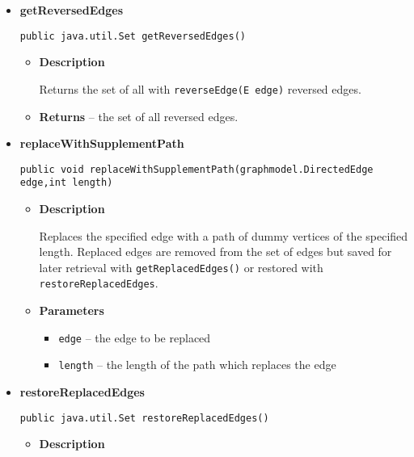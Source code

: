 {{{{{{{{{\begin{itemize}
{\begin{itemize}
{Returns the set of replaced edges.
}
\item{{\bf  Returns} -- 
the set of replaced edges 
}%
\end{itemize}
}%
\item{ 
{\bf  getReversedEdges}\\
\begin{lstlisting}[frame=none]
public java.util.Set getReversedEdges()\end{lstlisting} %
\begin{itemize}
\item{
{\bf  Description}

Returns the set of all with \texttt{\small reverseEdge(E edge)} reversed edges.
}
\item{{\bf  Returns} -- 
the set of all reversed edges. 
}%
\end{itemize}
}%
\item{ 
{\bf  replaceWithSupplementPath}\\
\begin{lstlisting}[frame=none]
public void replaceWithSupplementPath(graphmodel.DirectedEdge edge,int length)\end{lstlisting} %
\begin{itemize}
\item{
{\bf  Description}

Replaces the specified edge with a path of dummy vertices of the specified length. Replaced edges are removed from the set of edges but saved for later retrieval with \texttt{\small getReplacedEdges()} or restored with \texttt{\small restoreReplacedEdges}.
}
\item{
{\bf  Parameters}
  \begin{itemize}
   \item{
\texttt{edge} -- the edge to be replaced}
   \item{
\texttt{length} -- the length of the path which replaces the edge}
  \end{itemize}
}%
\end{itemize}
}%
\item{ 
{\bf  restoreReplacedEdges}\\
\begin{lstlisting}[frame=none]
public java.util.Set restoreReplacedEdges()\end{lstlisting} %
\begin{itemize}
\item{
{\bf  Description}

}
\end{itemize}}
\end{itemize}}}}}}}}}}

